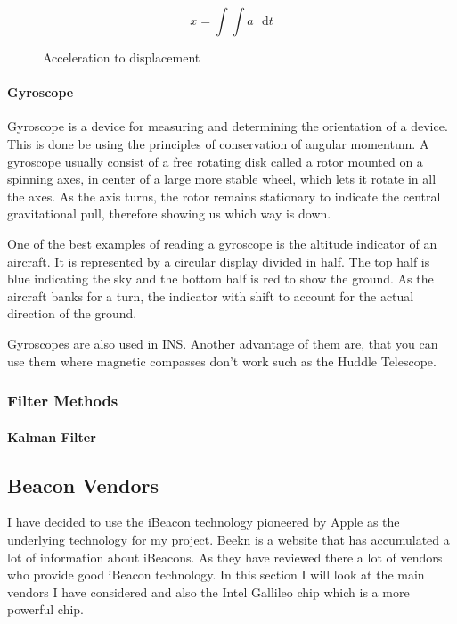 \begin{figure}[H]
\[
x=\int\int a\mathrm{\text{ }d}t
\]
 

\protect\caption{Acceleration to displacement}


\end{figure}



\paragraph{Gyroscope}

Gyroscope is a device for measuring and determining the orientation
of a device. This is done be using the principles of conservation
of angular momentum. A gyroscope usually consist of a free rotating
disk called a rotor mounted on a spinning axes, in center of a large
more stable wheel, which lets it rotate in all the axes. As the axis
turns, the rotor remains stationary to indicate the central gravitational
pull, therefore showing us which way is down.

One of the best examples of reading a gyroscope is the altitude indicator
of an aircraft. It is represented by a circular display divided in
half. The top half is blue indicating the sky and the bottom half
is red to show the ground. As the aircraft banks for a turn, the indicator
with shift to account for the actual direction of the ground.

Gyroscopes are also used in INS. Another advantage of them are, that
you can use them where magnetic compasses don't work such as the Huddle
Telescope\cite{gyroscope-wiki}.


\subsubsection{Filter Methods}


\paragraph{Kalman Filter}




\subsection{Beacon Vendors}

I have decided to use the iBeacon technology pioneered by Apple as
the underlying technology for my project. Beekn\cite{beekn} is a
website that has accumulated a lot of information about iBeacons.
As they have reviewed there a lot of vendors who provide good iBeacon
technology. In this section I will look at the main vendors I have
considered and also the Intel Gallileo chip which is a more powerful
chip.



